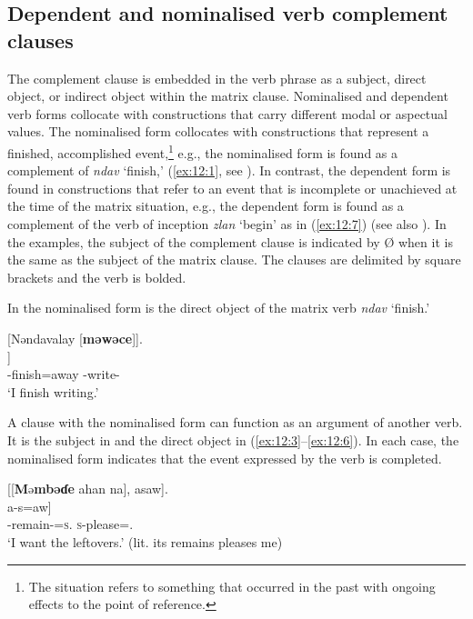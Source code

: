 \subsection{Dependent and nominalised verb complement clauses}\label{sec:12.1.1}
\hypertarget{RefHeading1213361525720847}{}
The complement clause is embedded in the verb phrase as a subject, direct object, or indirect object within the matrix clause.  Nominalised and dependent verb forms collocate with constructions that carry different modal or aspectual values. The nominalised form collocates %
with constructions that represent a finished, accomplished event,\footnote{The situation refers to something that occurred in the past with ongoing effects to the point of reference.} e.g., the nominalised form is found as a complement of \textit{ndav} ‘finish,’ (\ref{ex:12:1}, see ). In contrast, the dependent form is found in constructions that refer to an event that is incomplete or unachieved at the time of the matrix situation, e.g., the dependent form is found as a complement of the verb of inception %
\textit{zlan} ‘begin’ as in (\ref{ex:12:7}) (see also ). In the examples, the subject of the complement clause is indicated by Ø when it is the same as the subject of the matrix clause. The clauses are delimited by square brackets and the verb is bolded.

In  the nominalised form is the direct object of the matrix verb \textit{ndav} ‘finish.’ 

\ea \label{ex:12:1}
{}[Nəndavalay  [\textbf{məwəce}]].\\
\gll  [nə-ndav=alaj    [Ø \textbf{mu-wutʃ-ɛ}]]\\
      {\oneS}-finish=away    { }  {\NOM}-write-{\CL}\\
\glt  ‘I finish writing.’
\z 

A clause with the nominalised form can function as an argument of another verb. It is the subject in  and the direct object in (\ref{ex:12:3}--\ref{ex:12:6}). In each case, the nominalised form indicates that the event expressed by the verb is completed.

\ea \label{ex:12:2}
 [[\textbf{M}ə\textbf{mbəɗe} ahan   na],  asaw].\\
\gll  [[\textbf{mɪ-mbɪɗ-ɛ}=ahaŋ    na]   a-s=aw]\\
      {\NOM}-remain-{\CL}=\textsc{s}.{\POSS}  {\PSP}  \textsc{s}-please={\oneS}.{\IO}\\
\glt  ‘I want the leftovers.’ (lit. its remains pleases me) 
\z 

